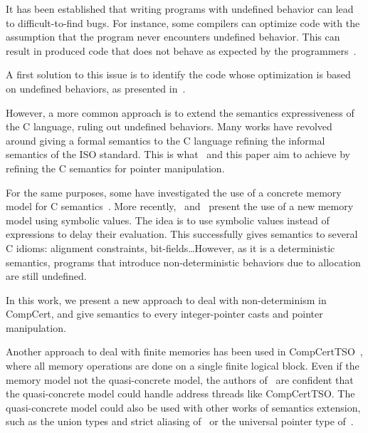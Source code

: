 It has been established that writing programs with undefined behavior can lead to difficult-to-find bugs.
For instance, some compilers can optimize code with the assumption that the program never encounters undefined behavior. This can result in produced code that does not behave as expected by the programmers~\cite{DBLP:conf/apsys/WangCCJZK12}.

A first solution to this issue is to identify the code whose optimization is based on undefined behaviors, as presented in~\cite{DBLP:conf/sosp/WangZKS13}.

However, a more common approach is to extend the semantics expressiveness of the C language, ruling out undefined behaviors.
Many works have revolved around giving a formal semantics to the C language refining the informal semantics of the ISO standard.
This is what~\cite{DBLP:conf/pldi/KangHMGZV15} and this paper aim to achieve by refining the C semantics for pointer manipulation.

For the same purposes, some have investigated the use of a concrete memory model for C semantics~\cite{DBLP:conf/popl/TuchKN07}\cite{Norrish98cformalised}.
More recently,~\cite{besson:hal-01093312} and~\cite{DBLP:conf/itp/BessonBW15} present the use of a new memory model using symbolic values. The idea is to use symbolic values instead of expressions to delay their evaluation. This successfully gives semantics to several C idioms: alignment constraints, bit-fields\dots However, as it is a deterministic semantics, programs that introduce non-deterministic behaviors due to allocation are still undefined.

In this work, we present a new approach to deal with non-determinism in CompCert, and give semantics to every integer-pointer casts and pointer manipulation.

Another approach to deal with finite memories has been used in CompCertTSO~\cite{DBLP:journals/jacm/SevcikVNJS13}, where all memory operations are done on a single finite logical block. Even if the memory model not the quasi-concrete model, the authors of~\cite{DBLP:conf/pldi/KangHMGZV15} are confident that the quasi-concrete model could handle address threads like CompCertTSO.
The quasi-concrete model could also be used with other works of semantics extension, such as the union types and strict aliasing of~\cite{DBLP:conf/cpp/Krebbers13} or the universal pointer type of~\cite{DBLP:conf/itp/KrebbersLW14}.
